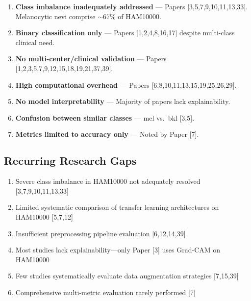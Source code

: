 \documentclass[11pt,a4paper]{article}
\begin{document}
\begin{gapbox}
\begin{enumerate}[leftmargin=*,itemsep=3pt]
\item \textbf{Class imbalance inadequately addressed} --- Papers [3,5,7,9,10,11,13,33]. Melanocytic nevi comprise $\sim$67\% of HAM10000.
\item \textbf{Binary classification only} --- Papers [1,2,4,8,16,17] despite multi-class clinical need.
\item \textbf{No multi-center/clinical validation} --- Papers [1,2,3,5,7,9,12,15,18,19,21,37,39].
\item \textbf{High computational overhead} --- Papers [6,8,10,11,13,15,19,25,26,29].
\item \textbf{No model interpretability} --- Majority of papers lack explainability.
\item \textbf{Confusion between similar classes} --- mel vs.\ bkl [3,5].
\item \textbf{Metrics limited to accuracy only} --- Noted by Paper [7].
\end{enumerate}
\end{gapbox}

\subsection{Recurring Research Gaps}

\begin{gapbox}
\begin{enumerate}[leftmargin=*,itemsep=3pt]
\item Severe class imbalance in HAM10000 not adequately resolved [3,7,9,10,11,13,33]
\item Limited systematic comparison of transfer learning architectures on HAM10000 [5,7,12]
\item Insufficient preprocessing pipeline evaluation [6,12,14,39]
\item Most studies lack explainability---only Paper [3] uses Grad-CAM on HAM10000
\item Few studies systematically evaluate data augmentation strategies [7,15,39]
\item Comprehensive multi-metric evaluation rarely performed [7]
\end{enumerate}
\end{gapbox}
\end{document}
